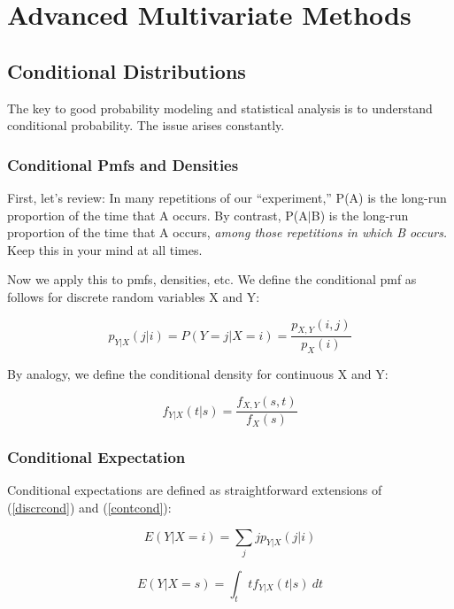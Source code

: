 \chapter{Advanced Multivariate Methods}
\label{advmul}

\section{Conditional Distributions}

The key to good probability modeling and statistical analysis is to
understand conditional probability.  The issue arises constantly.

\subsection{Conditional Pmfs and Densities}

First, let's review:  In many repetitions of our ``experiment,'' P(A) 
is the long-run proportion of the time that A occurs.  By contrast,
P(A$|$B) is the long-run proportion of the time that A occurs, {\it
among those repetitions in which B occurs.}  Keep this in your mind at
all times.

Now we apply this to pmfs, densities, etc.  We define the conditional
pmf as follows for discrete random variables X and Y:

\begin{equation}
\label{discrcond}
p_{Y|X}(j|i) = P(Y = j | X = i) = \frac{p_{X,Y}(i,j)}{p_X(i)}
\end{equation}

By analogy, we define the conditional density for continuous X and Y:

\begin{equation}
\label{contcond}
f_{Y|X}(t|s) = \frac{f_{X,Y}(s,t)}{f_X(s)}
\end{equation}

\subsection{Conditional Expectation}

Conditional expectations are defined as straightforward extensions of
(\ref{discrcond}) and (\ref{contcond}):

\begin{equation}
E(Y|X=i) = \sum_{j} j p_{Y|X}(j|i) 
\end{equation}

\begin{equation}
E(Y | X = s) = \int_{t} t f_{Y|X}(t|s) ~ dt
\end{equation}

